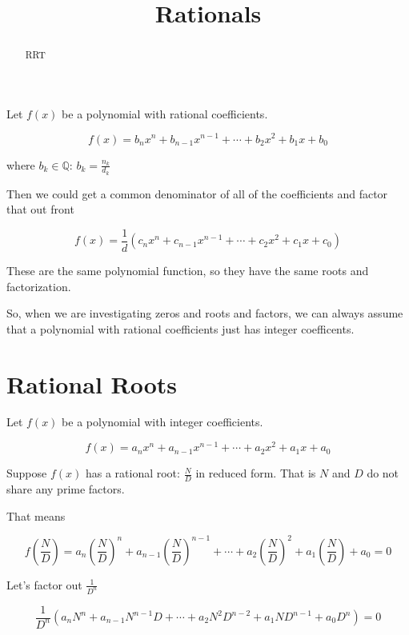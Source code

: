 \documentclass{ximera}
\title{Rationals}
\begin{document}
\begin{abstract}
RRT
\end{abstract}
\maketitle




Let $f(x)$ be a polynomial with rational coefficients.

\[   f(x) = b_n x^n + b_{n-1} x^{n-1} + \cdots + b_2 x^2 + b_1 x + b_0     \]


where $b_k \in \mathbb{Q}$:  $b_k = \frac{n_k}{d_k}$


Then we could get a common denominator of all of the coefficients and factor that out front



\[   f(x) = \frac{1}{d}(c_n x^n + c_{n-1} x^{n-1} + \cdots + c_2 x^2 + c_1 x + c_0)    \]


These are the same polynomial function, so they have the same roots and factorization.


So, when we are investigating zeros and roots and factors, we can always assume that a polynomial with rational coefficients just has integer coefficents.




\section*{Rational Roots}

Let $f(x)$ be a polynomial with integer coefficients.

\[   f(x) = a_n x^n + a_{n-1} x^{n-1} + \cdots + a_2 x^2 + a_1 x + a_0     \]


Suppose $f(x)$ has a rational root:  $\frac{N}{D}$ in reduced form.  That is $N$ and $D$ do not share any prime factors.



That means


\[    f \left( \frac{N}{D} \right) = a_n \left( \frac{N}{D} \right)^n + a_{n-1} \left( \frac{N}{D} \right)^{n-1} + \cdots + a_2 \left( \frac{N}{D} \right)^2 + a_1 \left( \frac{N}{D} \right) + a_0  = 0       \]


Let's factor out $\frac{1}{D^n}$





\[   \frac{1}{D^n} (a_n N^n + a_{n-1} N^{n-1} D + \cdots + a_2 N^2 D^{n-2}+ a_1 N D^{n-1} + a_0 D^n)  = 0       \]
\end{document}
